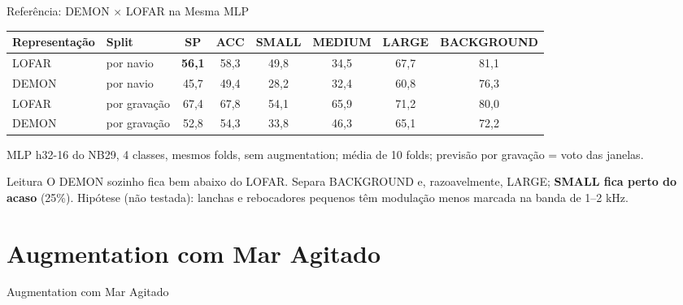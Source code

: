 \documentclass[aspectratio=169]{beamer}
\newcommand{\cahi}[1]{\cellcolor{green!30}\textbf{#1}}
\newcommand{\calo}[1]{\cellcolor{red!20}#1}
\begin{document}
\begin{frame}{Referência: DEMON $\times$ LOFAR na Mesma MLP}
    \footnotesize
    \begin{table}
    \centering
    \scriptsize
    \setlength{\tabcolsep}{4pt}
    \begin{tabular}{llcccccc}
    \toprule
    Representação & Split & SP & ACC & SMALL & MEDIUM & LARGE & BACKGROUND \\
    \midrule
    LOFAR & por navio & \cahi{56,1} & 58,3 & 49,8 & 34,5 & 67,7 & 81,1 \\
    DEMON & por navio & \calo{45,7} & 49,4 & \calo{28,2} & 32,4 & 60,8 & 76,3 \\
    \midrule
    LOFAR & por gravação & 67,4 & 67,8 & 54,1 & 65,9 & 71,2 & 80,0 \\
    DEMON & por gravação & 52,8 & 54,3 & 33,8 & 46,3 & 65,1 & 72,2 \\
    \bottomrule
    \end{tabular}
    \end{table}
    {\tiny MLP h32-16 do NB29, 4 classes, mesmos folds, sem augmentation; média de 10 folds; previsão por gravação = voto das janelas.\par}
    \vspace{0.1cm}
    \begin{alertblock}{Leitura}
        \scriptsize
        O DEMON sozinho fica bem abaixo do LOFAR. Separa BACKGROUND e, razoavelmente, LARGE; \textbf{SMALL fica perto do acaso} (25\%). Hipótese (não testada): lanchas e rebocadores pequenos têm modulação menos marcada na banda de 1--2 kHz.
    \end{alertblock}
\end{frame}

\section{Augmentation com Mar Agitado}

\begin{frame}
    \centering
    \huge Augmentation com Mar Agitado
\end{frame}
\end{document}
